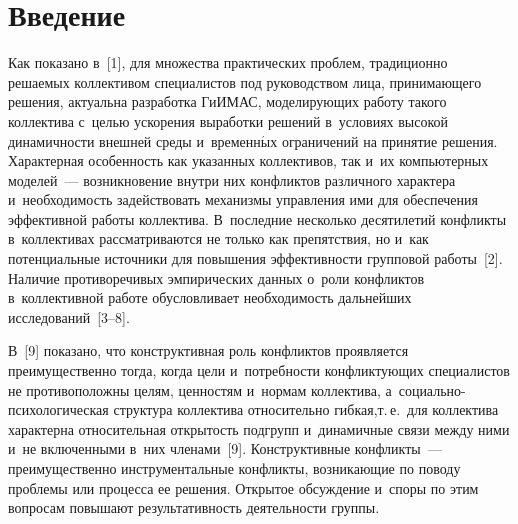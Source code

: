   
\vspace*{6pt}



\thispagestyle{headings}

\begin{multicols}{2}

\label{st\stat}

\section{Введение}

\vspace*{-3pt}
  
  Как показано в~[1], для множества практических проблем, традиционно 
решаемых коллективом специалистов под руководством лица, принимающего 
решения, актуальна разработка \mbox{ГиИМАС}, моделирующих работу такого коллектива с~\mbox{целью} ускорения выработки 
решений в~условиях высокой динамичности внешней среды и~временн$\acute{\mbox{ы}}$х 
ограничений на принятие решения. Характерная особенность как указанных 
коллективов, так и~их компьютерных моделей~--- возникновение внутри них 
конфликтов различного характера и~необходимость задействовать механизмы 
управления ими для обеспечения эффективной работы коллектива. 
В~последние несколько десятилетий конфликты в~коллективах 
рассматриваются не только как препятствия, но и~как потенциальные 
источники для повышения эффективности групповой работы~[2]. Наличие 
противоречивых эмпирических данных о~роли конф\-лик\-тов в~коллективной 
работе обусловливает необходимость дальнейших исследований~[3--8]. 
  
  В~[9] показано, что конструктивная роль конфликтов проявляется 
преимущественно тогда, когда цели и~потребности конф\-лик\-ту\-ющих 
специалистов не противоположны целям, ценностям и~нормам коллектива,  
а~со\-ци\-аль\-но-пси\-хо\-ло\-ги\-че\-ская структура коллектива относительно 
гибкая,\linebreak т.\,е.\ для коллектива характерна относительная открытость подгрупп
 и~динамичные связи между ними и~не включенными в~них членами~[9]. 
Конструктивные конфликты~--- преимущественно \mbox{инструментальные} 
конфликты, возникающие по поводу проблемы или процесса ее решения. 
Открытое обсуждение и~споры по этим вопросам повышают результативность 
деятельности \mbox{группы}.
{

}
  

\end{multicols}
